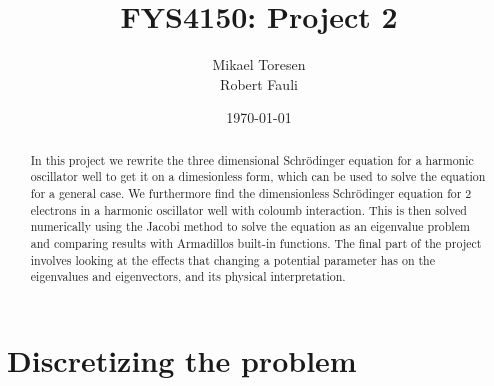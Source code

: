 \documentclass{article} %
\begin{document}
\title{FYS4150: Project 2}
\author{Mikael Toresen \\
	Robert Fauli}
\date{\today}
\maketitle
\begin{abstract}
In this project we rewrite the three dimensional Schr\"{o}dinger equation for a harmonic oscillator well to get it on a dimesionless form, which can be used to solve the equation for a general case. We furthermore find the dimensionless Schr\"{o}dinger equation for 2 electrons in a harmonic oscillator well with coloumb interaction. This is then solved numerically using the Jacobi method to solve the equation as an eigenvalue problem and comparing results with Armadillos built-in functions. The final part of the project involves looking at the effects that changing a potential parameter has on the eigenvalues and eigenvectors, and its physical interpretation.
\end{abstract}
\section{Discretizing the problem}\label{s:disc}
\end{document}
